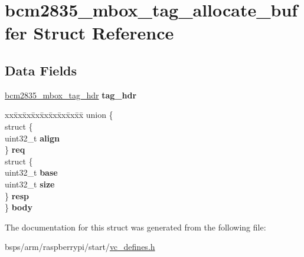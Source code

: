 \hypertarget{structbcm2835__mbox__tag__allocate__buffer}{}\section{bcm2835\+\_\+mbox\+\_\+tag\+\_\+allocate\+\_\+buffer Struct Reference}
\label{structbcm2835__mbox__tag__allocate__buffer}
\subsection*{Data Fields}
\begin{DoxyCompactItemize}
\item 
\mbox{\label{structbcm2835__mbox__tag__allocate__buffer_ade8296ecf38ae98f4595d00bcb5288dc}} 
\mbox{\hyperlink{structbcm2835__mbox__tag__hdr}{bcm2835\+\_\+mbox\+\_\+tag\+\_\+hdr}} {\bfseries tag\+\_\+hdr}
\item 
\mbox{\label{structbcm2835__mbox__tag__allocate__buffer_a7c73965c305e78175a34f8dd952eef47}} 
\begin{tabbing}
xx\=xx\=xx\=xx\=xx\=xx\=xx\=xx\=xx\=\kill
union \{\\
\>struct \{\\
\>\>uint32\_t {\bfseries align}\\
\>\} {\bfseries req}\\
\>struct \{\\
\>\>uint32\_t {\bfseries base}\\
\>\>uint32\_t {\bfseries size}\\
\>\} {\bfseries resp}\\
\} {\bfseries body}\\

\end{tabbing}\end{DoxyCompactItemize}


The documentation for this struct was generated from the following file\+:\begin{DoxyCompactItemize}
\item 
bsps/arm/raspberrypi/start/\mbox{\hyperlink{vc__defines_8h}{vc\+\_\+defines.\+h}}\end{DoxyCompactItemize}
